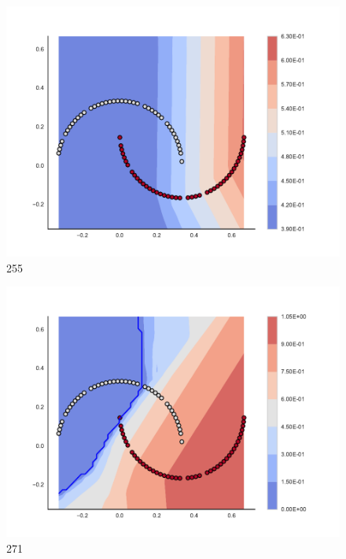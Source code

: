 \begin{subfigure}[b]{0.09\textwidth}
    \includegraphics[clip, trim=2.35cm 1.75cm 4.5cm 0cm,width=\textwidth]{img/convergence/255.pdf}
    \caption{255}
    \label{fig:convergence_255}
\end{subfigure}
%
\begin{subfigure}[b]{0.09\textwidth}
    \includegraphics[clip, trim=2.35cm 1.75cm 4.5cm 0cm,width=\textwidth]{img/convergence/271.pdf}
    \caption{271}
    \label{fig:convergence_271}
\end{subfigure}
%
